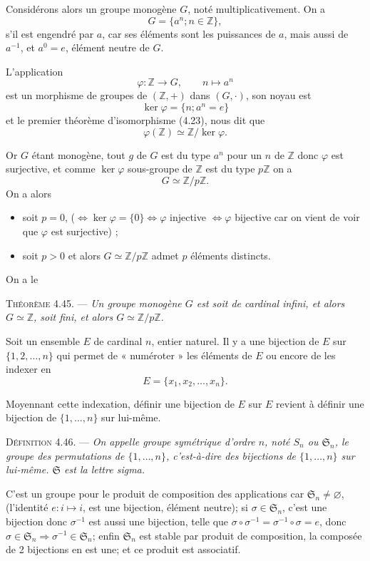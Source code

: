 Considérons alors un groupe monogène $G$, noté multiplicativement. On a
\[
G=\{a^n;n\in\mathbb Z\},
\]
s'il est engendré par $a$, car ses éléments sont les puissances de $a$, mais aussi de $a^{-1}$, et $a^0=e$, élément neutre de $G$.

L'application
\[
\varphi:\mathbb Z\longrightarrow G,\qquad n\longmapsto a^n
\]
est un morphisme de groupes de $(\mathbb Z,+)$ dans $(G,\cdot)$, son noyau est
\[
\ker\varphi=\{n;a^n=e\}
\]
et le premier théorème d'isomorphisme (4.23), nous dit que
\[
\varphi(\mathbb Z)\simeq\mathbb Z/\ker\varphi.
\]

Or $G$ étant monogène, tout $g$ de $G$ est du type $a^n$ pour un $n$ de $\mathbb Z$ donc $\varphi$ est surjective, et comme $\ker\varphi$ sous-groupe de $\mathbb Z$ est du type $p\mathbb Z$ on a
\[
G\simeq\mathbb Z/p\mathbb Z.
\]
On a alors
\begin{itemize}[leftmargin=2.2em]
\item soit $p=0$, ($\Longleftrightarrow\ker\varphi=\{0\}\Longleftrightarrow\varphi$ injective $\Longleftrightarrow\varphi$ bijective car on vient de voir que $\varphi$ est surjective) ;
\item soit $p>0$ et alors $G\simeq\mathbb Z/p\mathbb Z$ admet $p$ éléments distincts.
\end{itemize}
On a le

\medskip\noindent\textsc{Théorème 4.45.} --- \emph{Un groupe monogène $G$ est soit de cardinal infini, et alors $G\simeq\mathbb Z$, soit fini, et alors $G\simeq\mathbb Z/p\mathbb Z$.}



Soit un ensemble $E$ de cardinal $n$, entier naturel. Il y a une bijection de $E$ sur $\{1,2,\ldots,n\}$ qui permet de « numéroter » les éléments de $E$ ou encore de les indexer en
\[
E=\{x_1,x_2,\ldots,x_n\}.
\]

Moyennant cette indexation, définir une bijection de $E$ sur $E$ revient à définir une bijection de $\{1,\ldots,n\}$ sur lui-même.

\medskip\noindent\textsc{Définition 4.46.} --- \emph{On appelle groupe symétrique d'ordre $n$, noté $S_n$ ou $\mathfrak S_n$, le groupe des permutations de $\{1,\ldots,n\}$, c'est-à-dire des bijections de $\{1,\ldots,n\}$ sur lui-même. $\mathfrak S$ est la lettre sigma.}

C'est un groupe pour le produit de composition des applications car $\mathfrak S_n\ne\varnothing$, (l'identité $e:i\mapsto i$, est une bijection, élément neutre); si $\sigma\in\mathfrak S_n$, c'est une bijection donc $\sigma^{-1}$ est aussi une bijection, telle que $\sigma\circ\sigma^{-1}=\sigma^{-1}\circ\sigma=e$, donc $\sigma\in\mathfrak S_n\Rightarrow\sigma^{-1}\in\mathfrak S_n$; enfin $\mathfrak S_n$ est stable par produit de composition, la composée de 2 bijections en est une; et ce produit est associatif.

